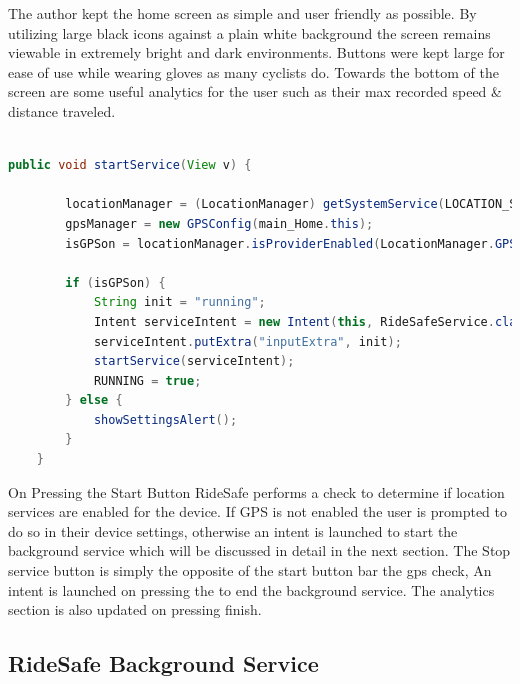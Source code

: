 The author kept the home screen as simple and user friendly as possible. By utilizing large black icons against a plain white background the screen remains viewable in extremely bright and dark environments. Buttons were kept large for ease of use while wearing gloves as many cyclists do. Towards the bottom of the screen are some useful analytics for the user such as their max recorded speed \& distance traveled. 


\begin{lstlisting}[language=Java,basicstyle=\small, breaklines=true, label={lst:labellll},caption={Starting the Crash Detection Service}]

public void startService(View v) {

        locationManager = (LocationManager) getSystemService(LOCATION_SERVICE);
        gpsManager = new GPSConfig(main_Home.this);
        isGPSon = locationManager.isProviderEnabled(LocationManager.GPS_PROVIDER);

        if (isGPSon) {
            String init = "running";
            Intent serviceIntent = new Intent(this, RideSafeService.class);
            serviceIntent.putExtra("inputExtra", init);
            startService(serviceIntent);
            RUNNING = true;
        } else {
            showSettingsAlert();
        }
    }
\end{lstlisting}

On Pressing the Start Button RideSafe performs a check to determine if location services are enabled for the device. If GPS is not enabled the user is prompted to do so in their device settings, otherwise an intent is launched to start the background service which will be discussed in detail in the next section. 
The Stop service button is simply the opposite of the start button bar the gps check, An intent is launched on pressing the to end the background service. The analytics section is also updated on pressing finish.  










\subsection{RideSafe Background Service}

